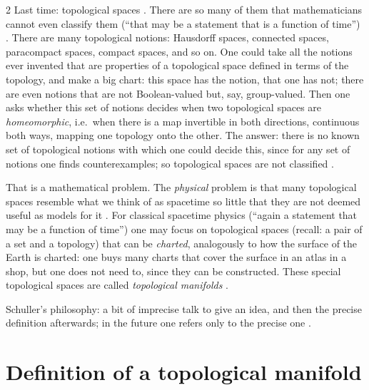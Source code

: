 \begin{paracol}{2}
Last time: topological spaces . There are so many of them that mathematicians cannot even classify them (``that may be a statement that is a function of time'')
. There are many topological notions: Hausdorff spaces, connected spaces, paracompact spaces, compact spaces, and so on. One could take
all the notions ever invented that are properties of a topological space defined in terms of the topology, and make a big chart: this space has the notion, that one has
not; there are even notions that are not Boolean-valued but, say, group-valued. Then one asks whether this set of notions decides when two topological spaces are
\emph{homeomorphic}, i.e.\ when there is a map invertible in both directions, continuous both ways, mapping one topology onto the other. The answer: there is no known set of
topological notions with which one could decide this, since for any set of notions one finds counterexamples; so topological spaces are not classified
.

That is a mathematical problem. The \emph{physical} problem is that many topological spaces resemble what we think of as spacetime so little that they are not deemed
useful as models for it . For classical spacetime physics (``again a statement that may be a function of time'') one may focus on topological
spaces (recall: a pair of a set and a topology) that can be \emph{charted}, analogously to how the surface of the Earth is charted: one buys many charts that cover the surface in an
atlas in a shop, but one does not need to, since they can be constructed. These special topological spaces are called \emph{topological manifolds}
.

Schuller's philosophy: a bit of imprecise talk to give an idea, and then the precise definition afterwards; in the future one refers only to the precise one .

\section{Definition of a topological manifold}\label{sec:c02-def}


\end{paracol}
